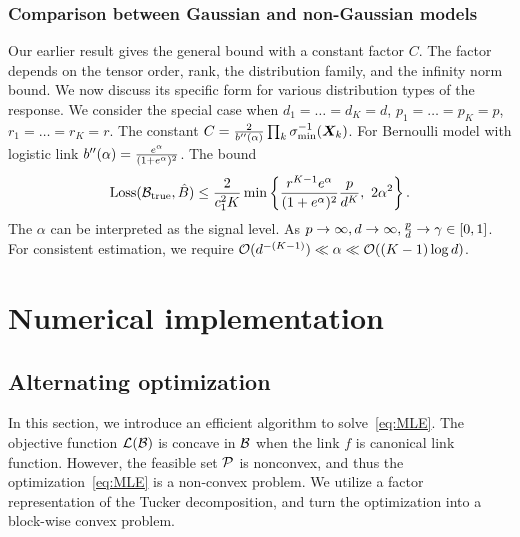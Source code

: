 \documentclass[11pt]{article}
\theoremstyle{plain}
\theoremstyle{definition}
\begin{document}
\subsubsection{Comparison between Gaussian and non-Gaussian models}
Our earlier result gives the general bound with a constant factor $C$. The factor depends on the tensor order, rank, the distribution family, and the infinity norm bound. We now discuss its specific form for various distribution types of the response. 
We consider the special case when $d_1=\ldots=d_K=d$, $p_1=\ldots=p_K=p$, $r_1=\ldots=r_K=r$. 
The constant $C={2\over b''(\alpha)} \prod_k\sigma^{-1}_{\min}(\bm X_k)$. For Bernoulli model with logistic link $b''(\alpha)={e^\alpha\over (1+e^\alpha)^2}$. 
The bound
\[
\text{Loss}(\trueB,\hat B)\leq {2\over c_1^2K}\min\left\{ {r^{K-1} e^\alpha\over (1+e^\alpha)^2} {p\over d^K},\ 2\alpha^2 \right\}.
\]
The $\alpha$ can be interpreted as the signal level. As $p\to\infty, d\to\infty, {p\over d} \to \gamma\in[0,1]$. For consistent estimation, we require $\mathcal{O}(d^{-(K-1)})\ll \alpha\ll \mathcal{O}((K-1)\log d)$. 


\newpage
\section{Numerical implementation}
\subsection{Alternating optimization}
In this section, we introduce an efficient algorithm to solve~\eqref{eq:MLE}. The objective function $\mathcal{L}(\mathcal{B})$ is concave in $\mathcal{B}$ when the link $f$ is canonical link function. However, the feasible set $\mathcal{P}$ is nonconvex, and thus the optimization~\eqref{eq:MLE} is a non-convex problem. We utilize a factor representation of the Tucker decomposition, and turn the optimization into a block-wise convex problem. 
\end{document}
